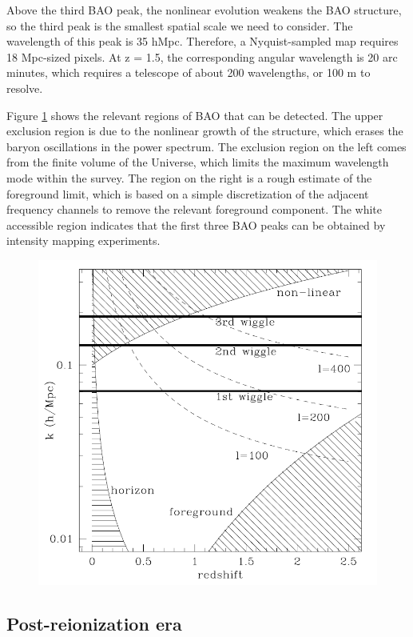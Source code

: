\documentclass{article}
\begin{document}
Above the third BAO peak, the nonlinear evolution weakens the BAO structure, so the third peak is the smallest spatial scale we need to consider. The wavelength of this peak is 35 hMpc. Therefore, a Nyquist-sampled map requires 18 Mpc-sized pixels. At z = 1.5, the corresponding angular wavelength is 20 arc minutes, which requires a telescope of about 200 wavelengths, or 100 m to resolve.

Figure \ref{BAOparameter} shows the relevant regions of BAO that can be detected. The upper exclusion region is due to the nonlinear growth of the structure, which erases the baryon oscillations in the power spectrum. The exclusion region on the left comes from the finite volume of the Universe, which limits the maximum wavelength mode within the survey. The region on the right is a rough estimate of the foreground limit, which is based on a simple discretization of the adjacent frequency channels to remove the relevant foreground component. The white accessible region indicates that the first three BAO peaks can be obtained by intensity mapping experiments.

\begin{figure}
    \centering
    \includegraphics[scale=0.35]{BAOparameter.png}
    \caption{}
    \label{BAOparameter}
\end{figure}


\subsection{Post-reionization era}
\end{document}
